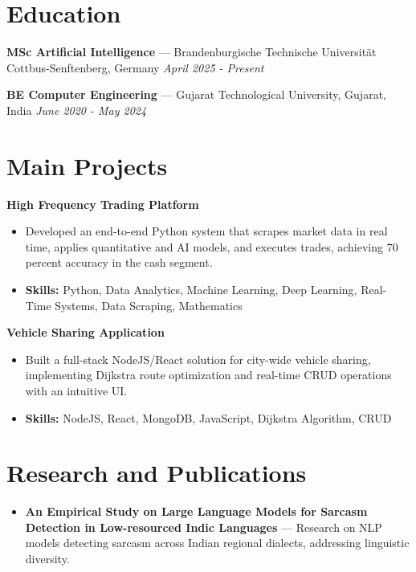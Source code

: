 \documentclass[a4paper,10pt]{article}
\begin{document}
\section*{Education}
\textbf{MSc Artificial Intelligence} — Brandenburgische Technische Universität Cottbus-Senftenberg, Germany \hfill \textit{April 2025 - Present}\par
\vspace{1.5pt}
\textbf{BE Computer Engineering} — Gujarat Technological University, Gujarat, India \hfill \textit{June 2020 - May 2024}\par

\section*{Main Projects}
\textbf{High Frequency Trading Platform}\par
\vspace{1pt}
\begin{itemize}
  \item Developed an end-to-end Python system that scrapes market data in real time, applies quantitative and AI models, and executes trades, achieving 70 percent accuracy in the cash segment.
  \item \textbf{Skills:} Python, Data Analytics, Machine Learning, Deep Learning, Real-Time Systems, Data Scraping, Mathematics
\end{itemize}
\vspace{3pt}
\textbf{Vehicle Sharing Application}\par
\vspace{1pt}
\begin{itemize}
  \item Built a full-stack NodeJS/React solution for city-wide vehicle sharing, implementing Dijkstra route optimization and real-time CRUD operations with an intuitive UI.
  \item \textbf{Skills:} NodeJS, React, MongoDB, JavaScript, Dijkstra Algorithm, CRUD
\end{itemize}

\section*{Research and Publications}
\begin{itemize}
\item \textbf{An Empirical Study on Large Language Models for Sarcasm Detection in Low-resourced Indic Languages} — Research on NLP models detecting sarcasm across Indian regional dialects, addressing linguistic diversity.
\end{itemize}
\end{document}
